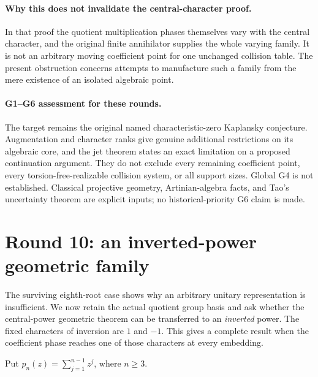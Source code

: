 \documentclass[11pt,a4paper,oneside]{report}
\theoremstyle{definition}
\theoremstyle{remark}
\begin{document}
\paragraph{Why this does not invalidate the central-character proof.}
In that proof the quotient multiplication phases themselves vary
with the central character, and the original finite annihilator
supplies the whole varying family. It is not an arbitrary moving
coefficient point for one unchanged collision table. The present
obstruction concerns attempts to manufacture such a family from
the mere existence of an isolated algebraic point.

\paragraph{G1--G6 assessment for these rounds.}
The target remains the original named characteristic-zero
Kaplansky conjecture. Augmentation and character ranks give genuine
additional restrictions on its algebraic core, and the jet theorem
states an exact limitation on a proposed continuation argument.
They do not exclude every remaining coefficient point, every
torsion-free-realizable collision system, or all support sizes.
Global G4 is not established. Classical projective geometry,
Artinian-algebra facts, and Tao's uncertainty theorem are explicit
inputs; no historical-priority G6 claim is made.

\section{Round 10: an inverted-power geometric family}
\label{M13:invpower:section}

The surviving eighth-root case shows why an arbitrary unitary
representation is insufficient. We now retain the actual quotient
group basis and ask whether the central-power geometric theorem can
be transferred to an \emph{inverted} power. The fixed characters of
inversion are $1$ and $-1$. This gives a complete result when the
coefficient phase reaches one of those characters at every embedding.

Put $p_n(z)=\sum_{j=1}^{n-1}z^j$, where $n\ge3$.
\end{document}
